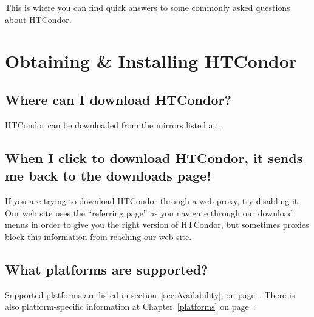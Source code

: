 

This is where you can find quick answers to some commonly asked
questions about HTCondor.

\section{Obtaining \& Installing HTCondor}

\subsection*{Where can I download HTCondor?}

HTCondor can be downloaded from the mirrors listed at
.  

\subsection*{When I click to download HTCondor, it sends me back to the downloads page!}

If you are trying to download HTCondor through a web proxy, try
disabling it.
Our web site uses the ``referring page'' as you navigate through our
download menus in order to give you the right version of HTCondor, but
sometimes proxies block this information from reaching our web site.

\subsection*{What platforms are supported?}

Supported platforms are listed in section~\ref{sec:Availability}, on
page~\pageref{sec:Availability}.
There is also platform-specific information at
Chapter~\ref{platforms} on page~\pageref{platforms}.

